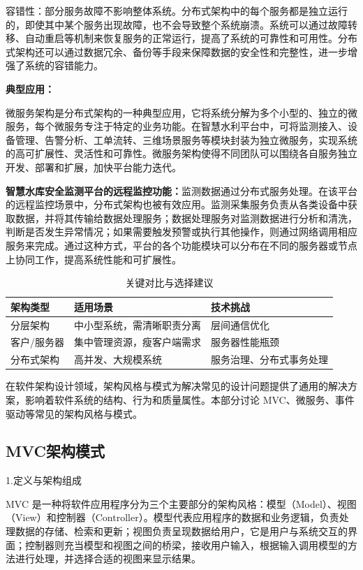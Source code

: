 容错性：部分服务故障不影响整体系统。分布式架构中的每个服务都是独立运行的，即使其中某个服务出现故障，也不会导致整个系统崩溃。系统可以通过故障转移、自动重启等机制来恢复服务的正常运行，提高了系统的可靠性和可用性。分布式架构还可以通过数据冗余、备份等手段来保障数据的安全性和完整性，进一步增强了系统的容错能力。

\textbf{典型应用：}

微服务架构是分布式架构的一种典型应用，它将系统分解为多个小型的、独立的微服务，每个微服务专注于特定的业务功能。在智慧水利平台中，可将监测接入、设备管理、告警分析、工单流转、三维场景服务等模块封装为独立微服务，实现系统的高可扩展性、灵活性和可靠性。微服务架构使得不同团队可以围绕各自服务独立开发、部署和扩展，加快平台能力迭代。

\textbf{智慧水库安全监测平台的远程监控功能：}监测数据通过分布式服务处理。在该平台的远程监控场景中，分布式架构也被有效应用。监测采集服务负责从各类设备中获取数据，并将其传输给数据处理服务；数据处理服务对监测数据进行分析和清洗，判断是否发生异常情况；如果需要触发预警或执行其他操作，则通过网络调用相应服务来完成。通过这种方式，平台的各个功能模块可以分布在不同的服务器或节点上协同工作，提高系统性能和可扩展性。

\begin{table}[htbp]
\centering
\caption{关键对比与选择建议}\label{tab:arch-comparison}
\begin{tabular}{lll}
\toprule
\textbf{架构类型} & \textbf{适用场景} & \textbf{技术挑战} \\
\midrule
分层架构     & 中小型系统，需清晰职责分离 & 层间通信优化 \\
客户/服务器   & 集中管理资源，瘦客户端需求  & 服务器性能瓶颈 \\
分布式架构   & 高并发、大规模系统        & 服务治理、分布式事务处理 \\
\bottomrule
\end{tabular}
\end{table}

在软件架构设计领域，架构风格与模式为解决常见的设计问题提供了通用的解决方案，影响着软件系统的结构、行为和质量属性。本部分讨论 MVC、微服务、事件驱动等常见的架构风格与模式。

\subsection{MVC架构模式}

1.定义与架构组成

MVC 是一种将软件应用程序分为三个主要部分的架构风格：模型（Model）、视图（View）和控制器（Controller）。模型代表应用程序的数据和业务逻辑，负责处理数据的存储、检索和更新；视图负责呈现数据给用户，它是用户与系统交互的界面；控制器则充当模型和视图之间的桥梁，接收用户输入，根据输入调用模型的方法进行处理，并选择合适的视图来显示结果。

